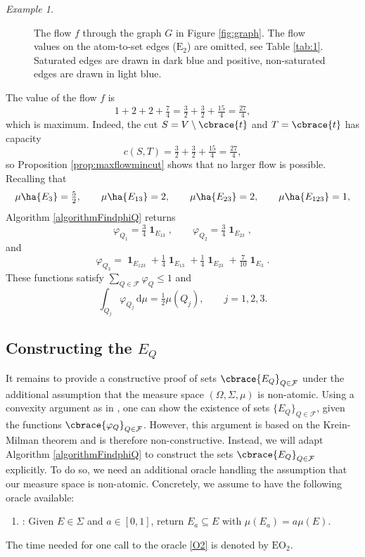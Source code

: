 \documentclass[a4paper, oneside,11pt]{amsart}
\theoremstyle{definition}
\theoremstyle{remark}
\newtheorem{example}[theorem]{Example}
\numberwithin{equation}{section}
\newcommand{\mc}{\mathcal}
\DeclarePairedDelimiter\cbrace\{\}
\DeclarePairedDelimiter\ha()
\newcommand{\dd}{\hspace{2pt}\mathrm{d}}
\DeclareMathOperator{\ind}{\mathbf{1}}
\begin{document}
\begin{example}
\begin{figure}[htbp]
{}
  \caption{The  flow $f$ through the graph $G$ in Figure \ref{fig:graph}. The flow values on the atom-to-set edges ($\mathrm{E}_2$) are omitted, see Table \ref{tab:1}. Saturated edges are drawn in dark blue and positive, non-saturated edges are drawn in light blue.}
  \label{fig:flow-example}
\end{figure}


The value of the flow $f$ is
\[
1+2+2+\tfrac74=\tfrac32+\tfrac32+\tfrac{15}{4}=\tfrac{27}{4},
\]
which is maximum. Indeed, the cut $S=V\setminus\cbrace{t}$ and $T=\cbrace{t}$ has capacity
\[
c(S,T)=\tfrac32+\tfrac32+\tfrac{15}{4}=\tfrac{27}{4},
\]
so Proposition \ref{prop:maxflowmincut} shows that no larger flow is possible.
Recalling that 
\[
\mu\ha{E_3}=\tfrac52,\qquad \mu\ha{E_{13}}=2,\qquad
\mu\ha{E_{23}}=2,\qquad \mu\ha{E_{123}}=1,
\]
Algorithm \ref{algorithmFindphiQ} returns
\[
\varphi_{Q_1}=\tfrac34\ind_{E_{13}},\qquad
\varphi_{Q_2}=\tfrac34\ind_{E_{23}},
\]
and
\[
\varphi_{Q_3}
=\ind_{E_{123}}
+\tfrac14\ind_{E_{13}}
+\tfrac14\ind_{E_{23}}
+ \tfrac{7}{10}\ind_{E_3}.
\]
These functions satisfy $\sum_{Q\in\mc{F}}\varphi_Q\leq 1$ and
\[
\int_{Q_j}\varphi_{Q_j}\dd\mu=\tfrac12\mu(Q_j),\qquad j=1,2,3.
\]
\end{example}


\subsection{Constructing the \texorpdfstring{$E_Q$}{EQ}} \label{subs:algorithms2}
It remains to provide a constructive proof of sets $\cbrace{E_Q}_{Q \in \mc{F}}$ under the additional assumption that  the measure space $(\Omega,\Sigma,\mu)$ is non-atomic. Using  a convexity argument as in \cite[Lemma 2.3]{Do75}, one can show the existence of sets $\{E_Q\}_{Q\in\mathcal{F}}$, given the functions $\cbrace{\varphi_Q}_{Q \in \mc{F}}$. However, this argument is based on the Krein-Milman theorem and is therefore non-constructive. Instead, we will adapt Algorithm \ref{algorithmFindphiQ} to construct the sets $\cbrace{E_Q}_{Q \in \mc{F}}$ explicitly. To do so, we need an additional oracle handling the assumption that our measure space is non-atomic. Concretely, we assume to have the following oracle available:
\begin{enumerate}[($\mathrm{O}_2$)]
  \item :  Given  $E\in \Sigma$ and $a \in [0,1]$, return $E_a \subseteq E$ with $\mu(E_a) = a \mu(E)$. \label{O2}
\end{enumerate}
The time needed for one call to the oracle \ref{O2} is denoted by $\mathrm{EO}_2$.
\end{document}
